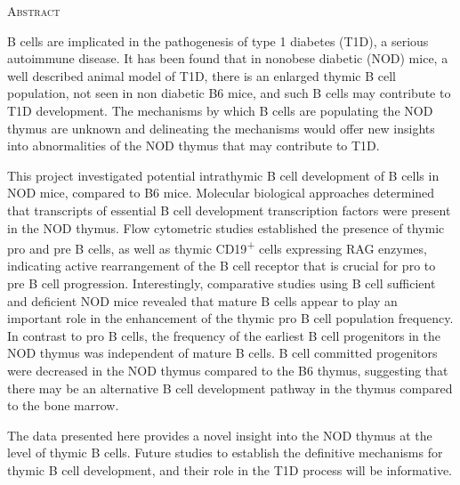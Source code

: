 
\newevenside
\begin{center}
\fontsize{29}{29}\scshape Abstract\\[1cm]
\end{center}

B cells are implicated in the pathogenesis of type 1 diabetes (T1D), a serious autoimmune disease. It has been found that in nonobese diabetic (NOD) mice, a well described animal model of T1D, there is an enlarged thymic B cell population, not seen in non diabetic B6 mice, and such B cells may contribute to T1D development. The mechanisms by which B cells are populating the NOD thymus are unknown and delineating the mechanisms would offer new insights into abnormalities of the NOD thymus that may contribute to T1D.

This project investigated potential intrathymic B cell development of B cells in NOD mice, compared to B6 mice. Molecular biological approaches determined that transcripts of essential B cell development transcription factors were present in the NOD thymus. Flow cytometric studies established the presence of thymic pro and pre B cells, as well as thymic CD19\textsuperscript{+} cells expressing RAG enzymes, indicating active rearrangement of the B cell receptor that is crucial for pro to pre B cell progression.
Interestingly, comparative studies using B cell sufficient and deficient NOD mice revealed that mature B cells appear to play an important role in the enhancement of the thymic pro B cell population frequency. 
In contrast to pro B cells, the frequency of the earliest B cell progenitors in the NOD thymus was independent of mature B cells. B cell committed progenitors were decreased in the NOD thymus compared to the B6 thymus, suggesting that there may be an alternative B cell development pathway in the thymus compared to the bone marrow.

The data presented here provides a novel insight into the NOD thymus at the level of thymic B cells. Future studies to establish the definitive mechanisms for thymic B cell development, and their role in the T1D process will be informative.


